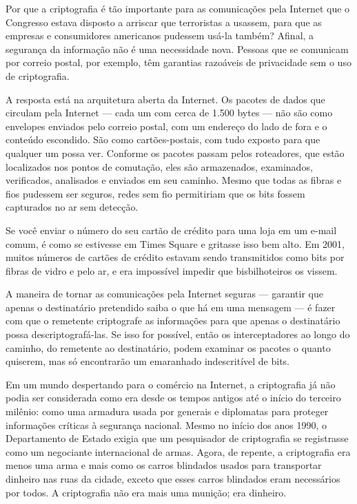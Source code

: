 \documentclass{book}
\begin{document}
Por que a criptografia é tão importante para as comunicações pela Internet que o Congresso estava disposto a arriscar que terroristas a usassem, para que as empresas e consumidores americanos pudessem usá-la também? Afinal, a segurança da informação não é uma necessidade nova. Pessoas que se comunicam por correio postal, por exemplo, têm garantias razoáveis de privacidade sem o uso de criptografia.

A resposta está na arquitetura aberta da Internet. Os pacotes de dados que circulam pela Internet --- cada um com cerca de 1.500 bytes --- não são como envelopes enviados pelo correio postal, com um endereço do lado de fora e o conteúdo escondido. São como cartões-postais, com tudo exposto para que qualquer um possa ver. Conforme os pacotes passam pelos roteadores, que estão localizados nos pontos de comutação, eles são armazenados, examinados, verificados, analisados e enviados em seu caminho. Mesmo que todas as fibras e fios pudessem ser seguros, redes sem fio permitiriam que os bits fossem capturados no ar sem detecção.

Se você enviar o número do seu cartão de crédito para uma loja em um e-mail comum, é como se estivesse em Times Square e gritasse isso bem alto. Em 2001, muitos números de cartões de crédito estavam sendo transmitidos como bits por fibras de vidro e pelo ar, e era impossível impedir que bisbilhoteiros os vissem.

A maneira de tornar as comunicações pela Internet seguras --- garantir que apenas o destinatário pretendido saiba o que há em uma mensagem --- é fazer com que o remetente criptografe as informações para que apenas o destinatário possa descriptografá-las. Se isso for possível, então os interceptadores ao longo do caminho, do remetente ao destinatário, podem examinar os pacotes o quanto quiserem, mas só encontrarão um emaranhado indescritível de bits.

Em um mundo despertando para o comércio na Internet, a criptografia já não podia ser considerada como era desde os tempos antigos até o início do terceiro milênio: como uma armadura usada por generais e diplomatas para proteger informações críticas à segurança nacional. Mesmo no início dos anos 1990, o Departamento de Estado exigia que um pesquisador de criptografia se registrasse como um negociante internacional de armas. Agora, de repente, a criptografia era menos uma arma e mais como os carros blindados usados para transportar dinheiro nas ruas da cidade, exceto que esses carros blindados eram necessários por todos. A criptografia não era mais uma munição; era dinheiro.
\end{document}
